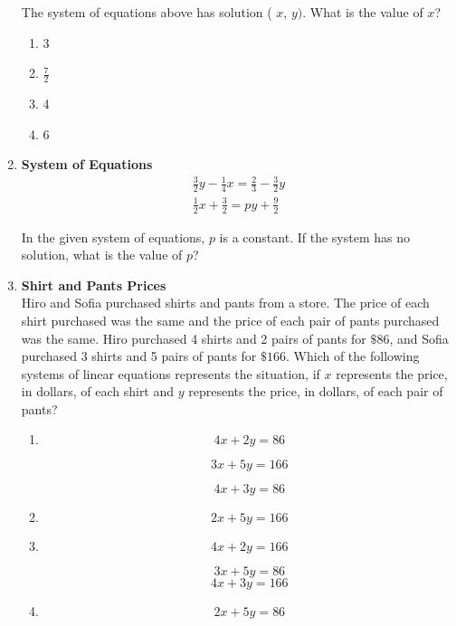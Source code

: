 \begin{enumerate}
The system of equations above has solution ( $x$, $y)$. What is the value of $x$?
\begin{enumerate}[label=(\Alph*)]
  \item 3
  \item $\frac{7}{2}$
  \item 4
  \item 6
\end{enumerate}
\begin{subanswer}
\end{subanswer}

\item \textbf{System of Equations}\\
$$
\begin{gathered}
\frac{3}{2}y - \frac{1}{4}x = \frac{2}{3} - \frac{3}{2}y \\
\frac{1}{2}x + \frac{3}{2} = py + \frac{9}{2}
\end{gathered}
$$

In the given system of equations, $p$ is a constant. If the system has no solution, what is the value of $p$?
\begin{subanswer}
\end{subanswer}

\item \textbf{Shirt and Pants Prices}\\
Hiro and Sofia purchased shirts and pants from a store. The price of each shirt purchased was the same and the price of each pair of pants purchased was the same. Hiro purchased 4 shirts and 2 pairs of pants for $\$ 86$, and Sofia purchased 3 shirts and 5 pairs of pants for $\$ 166$. Which of the following systems of linear equations represents the situation, if $x$ represents the price, in dollars, of each shirt and $y$ represents the price, in dollars, of each pair of pants?
\begin{enumerate}[label=(\Alph*)]
  \item
  $$
  4x + 2y = 86
  $$

  $$
  3x + 5y = 166
  $$

  $$
  4x + 3y = 86
  $$
  \item
  $$
  2x + 5y = 166
  $$
  \item
  $$
  4x + 2y = 166
  $$

  $$
  3x + 5y = 86
  $$
  $$
  4x + 3y = 166
  $$
  \item
  $$
  2x + 5y = 86
  $$
\end{enumerate}
\begin{subanswer}
\end{subanswer}


\end{enumerate}
